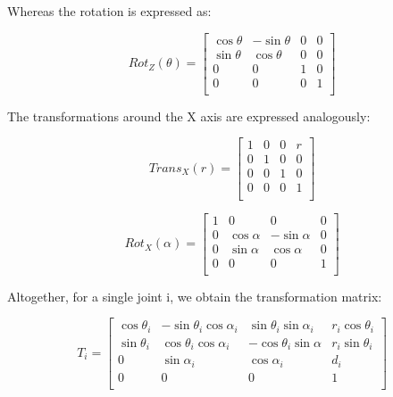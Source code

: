 Whereas the rotation is expressed as:

\begin{equation}
  Rot_Z(\theta) = \begin{bmatrix}
                    \cos{\theta} & -\sin{\theta} & 0 & 0 \\
                    \sin{\theta} & \cos{\theta} & 0 & 0 \\
                    0 & 0 & 1 & 0 \\ 0 & 0 & 0 & 1 \\
             \end{bmatrix}
\end{equation}

The transformations around the X axis are expressed analogously:

\begin{equation}
  Trans_X(r) = \begin{bmatrix}
                 1 & 0 & 0 & r \\ 0 & 1 & 0 & 0 \\ 0 & 0 & 1 & 0 \\ 0 & 0 & 0 & 1 \\
               \end{bmatrix}
\end{equation}


\begin{equation}
  Rot_X(\alpha) = \begin{bmatrix}
                    1 & 0 & 0 & 0 \\
                    0 & \cos{\alpha} & -\sin{\alpha} & 0 \\
                    0 & \sin{\alpha} & \cos{\alpha} & 0 \\
                    0 & 0 & 0 & 1 \\
             \end{bmatrix}
\end{equation}

Altogether, for a single joint i, we obtain the transformation matrix:

\begin{equation}
  T_i = \begin{bmatrix}
          \cos{\theta_i} & -\sin{\theta_i}\cos{\alpha_i} & \sin{\theta_i}\sin{\alpha_i} & r_i\cos{\theta_i} \\
          \sin{\theta_i} & \cos{\theta_i}\cos{\alpha_i} & -\cos{\theta_i}\sin{\alpha} & r_i\sin{\theta_i} \\
          0 & \sin{\alpha_i} & \cos{\alpha_i} & d_i \\
          0 & 0 & 0 & 1 \\
        \end{bmatrix}
\end{equation}

